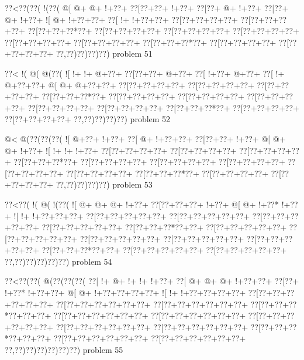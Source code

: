 \vbox{\vbox{\goo
\0??<\0??(\0??(\- !(\0??(
\- @[\- @+\- @+\- !+\0??+
\0??[\0??+\0??+\- !+\0??+
\0??[\0??+\- @+\- !+\0??+
\0??[\0??+\- @+\- !+\0??+
\- ![\- @+\- !+\0??+\0??+
\0??[\- !+\- !+\0??+\0??+
\0??[\0??+\0??+\0??+\0??+
\0??[\0??+\0??+\0??+\0??+
\0??[\0??+\0??+\0??*\0??+
\0??[\0??+\0??+\0??+\0??+
\0??[\0??+\0??+\0??+\0??+
\0??[\0??+\0??+\0??+\0??+
\0??[\0??+\0??+\0??+\0??+
\0??[\0??+\0??+\0??+\0??+
\0??[\0??+\0??+\0??*\0??+
\0??[\0??+\0??+\0??+\0??+
\0??[\0??+\0??+\0??+\0??+
\0??,\0??)\0??)\0??)\0??)
}
\hfil problem 51\hfil\break
}

\vbox{\vbox{\goo
\0??<\- !(\- @(\- @(\0??(
\- ![\- !+\- !+\- @+\0??+
\0??[\0??+\0??+\- @+\0??+
\0??[\- !+\0??+\- @+\0??+
\0??[\- !+\- @+\0??+\0??+
\- @[\- @+\- @+\0??+\0??+
\0??[\0??+\0??+\0??+\0??+
\0??[\0??+\0??+\0??+\0??+
\0??[\0??+\0??+\0??+\0??+
\0??[\0??+\0??+\0??*\0??+
\0??[\0??+\0??+\0??+\0??+
\0??[\0??+\0??+\0??+\0??+
\0??[\0??+\0??+\0??+\0??+
\0??[\0??+\0??+\0??+\0??+
\0??[\0??+\0??+\0??+\0??+
\0??[\0??+\0??+\0??*\0??+
\0??[\0??+\0??+\0??+\0??+
\0??[\0??+\0??+\0??+\0??+
\0??,\0??)\0??)\0??)\0??)
}
\hfil problem 52\hfil\break
}

\vbox{\vbox{\goo
\- @<\- @(\0??(\0??(\0??(
\- ![\- @+\0??+\- !+\0??+
\0??[\- @+\- !+\0??+\0??+
\0??[\0??+\0??+\- !+\0??+
\- @[\- @+\- @+\- !+\0??+
\- ![\- !+\- !+\- !+\0??+
\0??[\0??+\0??+\0??+\0??+
\0??[\0??+\0??+\0??+\0??+
\0??[\0??+\0??+\0??+\0??+
\0??[\0??+\0??+\0??*\0??+
\0??[\0??+\0??+\0??+\0??+
\0??[\0??+\0??+\0??+\0??+
\0??[\0??+\0??+\0??+\0??+
\0??[\0??+\0??+\0??+\0??+
\0??[\0??+\0??+\0??+\0??+
\0??[\0??+\0??+\0??*\0??+
\0??[\0??+\0??+\0??+\0??+
\0??[\0??+\0??+\0??+\0??+
\0??,\0??)\0??)\0??)\0??)
}
\hfil problem 53\hfil\break
}

\vbox{\vbox{\goo
\0??<\0??(\- !(\- @(\- !(\0??(
\- ![\- @+\- @+\- @+\- !+\0??+
\0??[\0??+\0??+\0??+\- !+\0??+
\- @[\- @+\- !+\0??*\- !+\0??+
\- ![\- !+\- !+\0??+\0??+\0??+
\0??[\0??+\0??+\0??+\0??+\0??+
\0??[\0??+\0??+\0??+\0??+\0??+
\0??[\0??+\0??+\0??+\0??+\0??+
\0??[\0??+\0??+\0??+\0??+\0??+
\0??[\0??+\0??+\0??*\0??+\0??+
\0??[\0??+\0??+\0??+\0??+\0??+
\0??[\0??+\0??+\0??+\0??+\0??+
\0??[\0??+\0??+\0??+\0??+\0??+
\0??[\0??+\0??+\0??+\0??+\0??+
\0??[\0??+\0??+\0??+\0??+\0??+
\0??[\0??+\0??+\0??*\0??+\0??+
\0??[\0??+\0??+\0??+\0??+\0??+
\0??[\0??+\0??+\0??+\0??+\0??+
\0??,\0??)\0??)\0??)\0??)\0??)
}
\hfil problem 54\hfil\break
}

\vbox{\vbox{\goo
\0??<\0??(\0??(\- @(\0??(\0??(\0??(
\0??[\- !+\- @+\- !+\- !+\- !+\0??+
\0??[\- @+\- @+\- @+\- !+\0??+\0??+
\0??[\0??+\- !+\0??*\- !+\0??+\0??+
\- @[\- @+\- !+\0??+\0??+\0??+\0??+
\- ![\- !+\- !+\0??+\0??+\0??+\0??+
\0??[\0??+\0??+\0??+\0??+\0??+\0??+
\0??[\0??+\0??+\0??+\0??+\0??+\0??+
\0??[\0??+\0??+\0??+\0??+\0??+\0??+
\0??[\0??+\0??+\0??*\0??+\0??+\0??+
\0??[\0??+\0??+\0??+\0??+\0??+\0??+
\0??[\0??+\0??+\0??+\0??+\0??+\0??+
\0??[\0??+\0??+\0??+\0??+\0??+\0??+
\0??[\0??+\0??+\0??+\0??+\0??+\0??+
\0??[\0??+\0??+\0??+\0??+\0??+\0??+
\0??[\0??+\0??+\0??*\0??+\0??+\0??+
\0??[\0??+\0??+\0??+\0??+\0??+\0??+
\0??[\0??+\0??+\0??+\0??+\0??+\0??+
\0??,\0??)\0??)\0??)\0??)\0??)\0??)
}
\hfil problem 55\hfil\break
}


